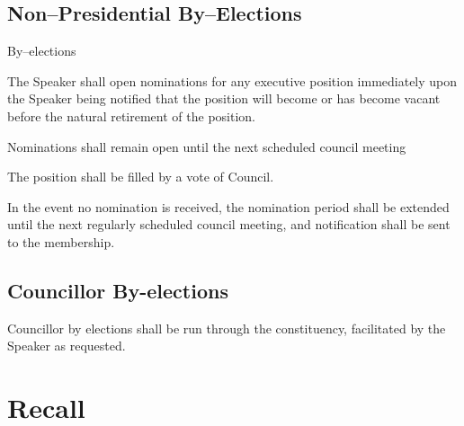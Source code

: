 \subsection {Non--Presidential By--Elections}
\begin{longenum}[ label*=\thesubsection.\arabic*., align=left]
\item By--elections
	\begin{longenum}[ label*=\arabic*., align=left]
		\item The Speaker shall open nominations for any executive position immediately upon the Speaker being
notified that the position will become or has become vacant before the natural retirement of the position. 
		\item Nominations shall remain open until the next scheduled council meeting
		\item The position shall be filled by a vote of Council.
		\item In the event no nomination is received, the nomination period shall be extended until the next regularly scheduled council meeting, and notification shall be sent to the membership.
	\end{longenum}
\end{longenum}    
\subsection{Councillor By-elections}
\begin{longenum}[ label*=\thesubsection.\arabic*., align=left]
	\item Councillor by elections shall be run through the constituency, facilitated by the Speaker as requested.
\end{longenum}    
\newpage

\section{Recall}
